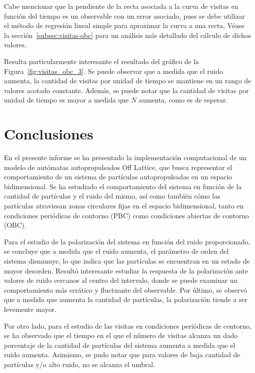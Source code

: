 \documentclass[11pt, a4paper]{article}
\begin{document}
            Cabe mencionar que la pendiente de la recta asociada a la curva de visitas en función del tiempo es un
            observable con un error asociado, pues se debe utilizar el método de regresión lineal simple para aproximar
            la curva a una recta.
            Véase la sección~\ref{subsec:visitas-obc} para un análisis más detallado del cálculo de dichos valores.

            Resulta particularmente interesante el resultado del gráfico de la Figura~\ref{fig:visitas_obc_3}.
            Se puede observar que a medida que el ruido aumenta, la cantidad de visitas por unidad de tiempo se mantiene
            en un rango de valores acotado constante.
            Además, se puede notar que la cantidad de visitas por unidad de tiempo es mayor a medida que $N$ aumenta,
            como es de esperar.

    \newpage

    \section{Conclusiones}
    \label{sec:conclusiones}

        En el presente informe se ha presentado la implementación computacional de un modelo de autómatas autopropulsados
        Off Lattice, que busca representar el comportamiento de un sistema de partículas autopropulsadas en un espacio
        bidimensional.
        Se ha estudiado el comportamiento del sistema en función de la cantidad de partículas y el ruido del mismo, así como
        también cómo las partículas atraviesan zonas circulares fijas en el espacio bidimensional, tanto en condiciones
        periódicas de contorno (PBC) como condiciones abiertas de contorno (OBC).
        
        Para el estudio de la polarización del sistema en función del ruido proporcionado, se concluye que a medida que
        el ruido aumenta, el parámetro de orden del sistema disminuye, lo que indica que las partículas se encuentran en
        un estado de mayor desorden.
        Resultó interesante estudiar la respuesta de la polarización ante valores de ruido cercanos al centro del
        intervalo, donde se puede examinar un comportamiento más errático y fluctuante del observable.
        Por último, se observó que a medida que aumenta la cantidad de partículas, la polarización tiende a ser
        levemente mayor.

        Por otro lado, para el estudio de las visitas en condiciones periódicas de contorno, se ha observado que el
        tiempo en el que el número de visitas alcanza un dado porcentaje de la cantidad de partículas del sistema aumenta
        a medida que el ruido aumenta.
        Asimismo, se pudo notar que para valores de baja cantidad de partículas y/o alto ruido, no se alcanza el umbral.
\end{document}

